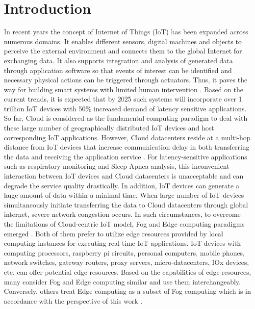 \documentclass[final,5p,times,twocolumn]{elsarticle}
\begin{document}

\section{Introduction}
In recent years the concept of Internet of Things (IoT) has been expanded across numerous domains. It enables different sensors, digital machines and objects to perceive the external environment and connects them to the global Internet for exchanging data. It also supports integration and analysis of generated data through application software so that events of interest can be identified and necessary physical actions can be triggered through actuators. Thus, it paves the way for building smart systems with limited human intervention \cite{IoT}. Based on the current trends, it is expected that by 2025 such systems will incorporate over 1 trillion IoT devices with 50\% increased demand of latency sensitive applications\cite{mcKinsey}. So far, Cloud is considered as the fundamental computing paradigm to deal with these large number of geographically distributed IoT devices and host corresponding IoT applications. However, Cloud datacenters reside at a multi-hop distance from IoT devices that increase communication delay in both transferring the data and receiving the application service \cite{speed}. For latency-sensitive applications such as respiratory monitoring and Sleep Apnea analysis, this inconvenient interaction between IoT devices and Cloud datacenters is unacceptable and can degrade the service quality drastically. In addition, IoT devices can generate a huge amount of data within a minimal time. When large number of IoT devices simultaneously initiate transferring the data to Cloud datacenters through global internet, severe network congestion occurs. In such circumstances, to overcome the limitations of Cloud-centric IoT model, Fog and Edge computing paradigms emerged \cite{FogInit}. Both of them prefer to utilize edge resources provided by local computing instances for executing real-time IoT applications. IoT devices with computing processors, raspberry pi circuits, personal computers, mobile phones, network switches, gateway routers, proxy servers, micro-datacenters, IOx devices, etc. can offer potential edge resources. Based on the capabilities of edge resources, many consider Fog and Edge computing similar and use them interchangeably. Conversely, others treat Edge computing as a subset of Fog computing which is in accordance with the perspective of this work \cite{me}.                 
%
\end{document}
